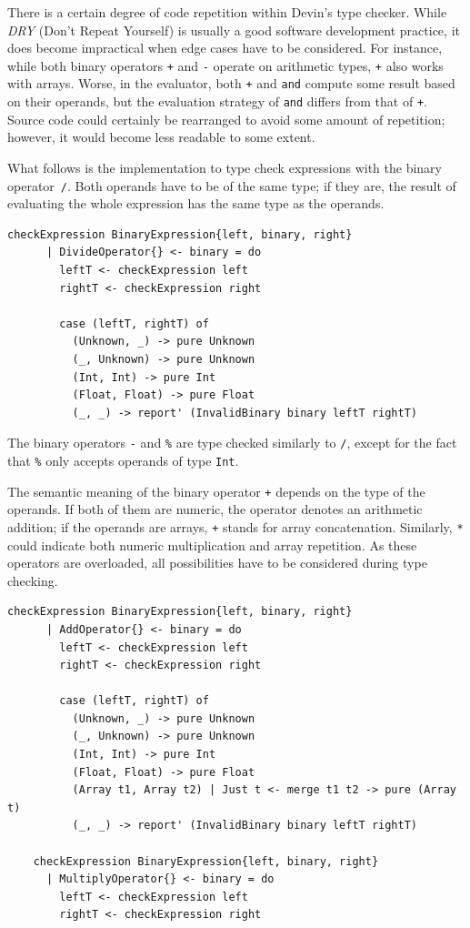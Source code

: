 \documentclass[UdineBachThesis,american,11pt]{PhdThesis}
\begin{document}
  There is a certain degree of code repetition within Devin's type checker.
  While \emph{DRY} (Don't Repeat Yourself) is usually a good software
  development practice, it does become impractical when edge cases have to be
  considered. For instance, while both binary operators \texttt{+} and
  \texttt{-} operate on arithmetic types, \texttt{+} also works with arrays.
  Worse, in the evaluator, both \texttt{+} and \mbox{\texttt{and}} compute some
  result based on their operands, but the evaluation strategy of
  \mbox{\texttt{and}} differs from that of \texttt{+}. Source code could
  certainly be rearranged to avoid some amount of repetition; however, it would
  become less readable to some extent.

  What follows is the implementation to type check expressions with the binary
  operator~\texttt{/}. Both operands have to be of the same type; if they are,
  the result of evaluating the whole expression has the same type as the
  operands.

  \begin{Verbatim}[gobble=4,fontsize=\small]
    checkExpression BinaryExpression{left, binary, right}
      | DivideOperator{} <- binary = do
        leftT <- checkExpression left
        rightT <- checkExpression right

        case (leftT, rightT) of
          (Unknown, _) -> pure Unknown
          (_, Unknown) -> pure Unknown
          (Int, Int) -> pure Int
          (Float, Float) -> pure Float
          (_, _) -> report' (InvalidBinary binary leftT rightT)
  \end{Verbatim}

  The binary operators \texttt{-} and \texttt{\%} are type checked similarly to
  \texttt{/}, except for the fact that \texttt{\%} only accepts operands of type
  \mbox{\texttt{Int}}.

  The semantic meaning of the binary operator \texttt{+} depends on the type of
  the operands. If both of them are numeric, the operator denotes an arithmetic
  addition; if the operands are arrays, \texttt{+} stands for array
  concatenation. Similarly, \texttt{*} could indicate both numeric
  multiplication and array repetition. As these operators are overloaded, all
  possibilities have to be considered during type checking.

  \begin{Verbatim}[gobble=4,fontsize=\small]
    checkExpression BinaryExpression{left, binary, right}
      | AddOperator{} <- binary = do
        leftT <- checkExpression left
        rightT <- checkExpression right

        case (leftT, rightT) of
          (Unknown, _) -> pure Unknown
          (_, Unknown) -> pure Unknown
          (Int, Int) -> pure Int
          (Float, Float) -> pure Float
          (Array t1, Array t2) | Just t <- merge t1 t2 -> pure (Array t)
          (_, _) -> report' (InvalidBinary binary leftT rightT)

    checkExpression BinaryExpression{left, binary, right}
      | MultiplyOperator{} <- binary = do
        leftT <- checkExpression left
        rightT <- checkExpression right
  \end{Verbatim}
\end{document}
